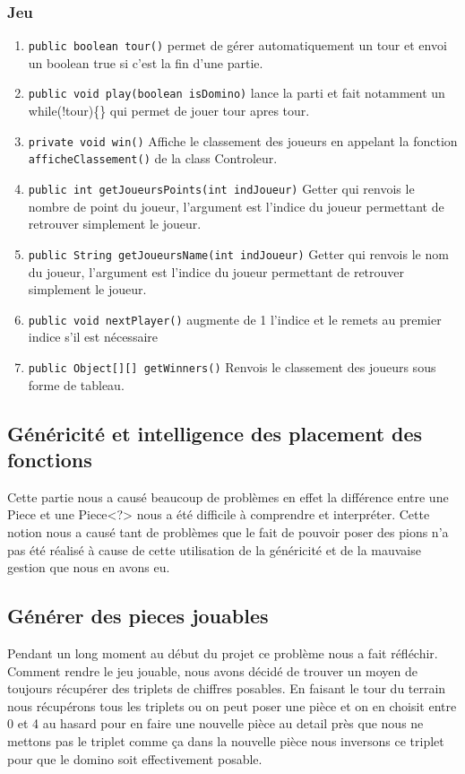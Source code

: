 \documentclass[11pt]{article}
\begin{document}
\subsubsection{Jeu}
\label{sec:orgc92782c}
\begin{enumerate}
\item \texttt{public boolean tour()} permet de gérer automatiquement un tour et envoi un boolean true si c'est la fin d'une partie.
\item \texttt{public void play(boolean isDomino)} lance la parti et fait notamment un while(!tour)\{\} qui permet de jouer tour apres tour.
\item \texttt{private void win()} Affiche le classement des joueurs en appelant la fonction \texttt{afficheClassement()} de la class Controleur.
\item \texttt{public int getJoueursPoints(int indJoueur)}  Getter qui renvois le nombre de point du joueur, l'argument est l'indice du joueur permettant de retrouver simplement le joueur.
\item \texttt{public String getJoueursName(int indJoueur)} Getter qui renvois le nom du joueur, l'argument est l'indice du joueur permettant de retrouver simplement le joueur.
\item \texttt{public void nextPlayer()} augmente de 1 l'indice et le remets au premier indice s'il est nécessaire
\item \texttt{public Object[][] getWinners()} Renvois le classement des joueurs sous forme de tableau.
\end{enumerate}
\subsection{Généricité et intelligence des placement des fonctions}
\label{sec:org7931746}
Cette partie nous a causé beaucoup de problèmes en effet la différence entre une Piece et une Piece<?> nous a été difficile à comprendre et interpréter. Cette notion nous a causé tant de problèmes que le fait de pouvoir poser des pions n’a pas été réalisé à cause de cette utilisation de la généricité et de la mauvaise gestion que nous en avons eu. 
\subsection{Générer des pieces jouables}
\label{sec:orgad9d938}
Pendant un long moment au début du projet ce problème nous a fait réfléchir. Comment rendre le jeu jouable, nous avons décidé de trouver un moyen de toujours récupérer des triplets de chiffres posables. En faisant le tour du terrain nous récupérons tous les triplets ou on peut poser une pièce et on en choisit entre 0 et 4 au hasard pour en faire une nouvelle pièce au detail près que nous ne mettons pas le triplet comme ça dans la nouvelle pièce nous inversons ce triplet pour que le domino soit effectivement posable. 
\end{document}
